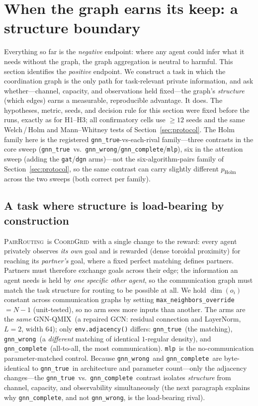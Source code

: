 \documentclass[manuscript, screen, review]{jair}
\newcommand{\algoname}[1]{\textsc{#1}}
\newcommand{\gnnqmix}{\algoname{GNN-QMIX}}
\newcommand{\coordgrid}{\textsc{CoordGrid}}
\newcommand{\gtrue}{\texttt{gnn\_true}}
\newcommand{\gwrong}{\texttt{gnn\_wrong}}
\newcommand{\gcomplete}{\texttt{gnn\_complete}}
\newcommand{\mlpc}{\texttt{mlp}}
\newcommand{\pairrouting}{\textsc{PairRouting}}
\begin{document}
\section{When the graph earns its keep: a structure boundary}
\label{sec:results:structure}

Everything so far is the \emph{negative} endpoint: where any agent could
infer what it needs without the graph, the graph aggregation is neutral to
harmful. This section identifies the \emph{positive} endpoint. We construct a
task in which the coordination graph is the only path for task-relevant
private information, and ask whether---channel, capacity, and observations
held fixed---the graph's \emph{structure} (which edges) earns a measurable,
reproducible advantage. It does. The hypotheses, metric, seeds, and decision
rule for this section were fixed before the runs, exactly as for H1--H3;
all confirmatory cells use $\ge 12$ seeds and the same Welch\,/\,Holm and
Mann--Whitney tests of Section~\ref{sec:protocol}. The Holm family here is the
registered \gtrue-vs-each-rival family---three contrasts in the core sweep
(\gtrue\ vs.\ \gwrong/\gcomplete/\mlpc), six in the attention sweep (adding the
\texttt{gat}/\texttt{dgn} arms)---not the six-algorithm-pairs family of
Section~\ref{sec:protocol}, so the same contrast can carry slightly different
$p_{\text{Holm}}$ across the two sweeps (both correct per family).

\subsection{A task where structure is load-bearing by construction}
\label{sec:pairrouting}

\pairrouting\ is \coordgrid\ with a single change to the reward: every agent
privately observes \emph{its own} goal and is rewarded (dense toroidal
proximity) for reaching its \emph{partner's} goal, where a fixed perfect
matching defines partners. Partners must therefore exchange goals across
their edge; the information an agent needs is held by \emph{one specific
other agent}, so the communication graph must match the task structure for
routing to be possible at all. We hold $\dim(o_i)$ constant across
communication graphs by setting \texttt{max\_neighbors\_override}$=N{-}1$
(unit-tested), so no arm sees more inputs than another. The arms are the
\emph{same} \gnnqmix\ (a repaired GCN: residual connection and LayerNorm,
$L{=}2$, width 64); only \texttt{env.adjacency()} differs:
\gtrue\ (the matching), \gwrong\ (a \emph{different} matching of identical
$1$-regular density), and \gcomplete\ (all-to-all, the most communication).
\mlpc\ is the no-communication parameter-matched control. Because \gwrong\
and \gcomplete\ are byte-identical to \gtrue\ in architecture and parameter
count---only the adjacency changes---the \gtrue\ vs.\ \gcomplete\ contrast
isolates \emph{structure} from channel, capacity, and observability
simultaneously (the next paragraph explains why \gcomplete, and not \gwrong,
is the load-bearing rival).
\end{document}
